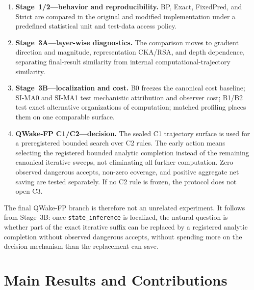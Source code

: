 \begin{enumerate}
  \item \textbf{Stage~1/2---behavior and reproducibility.} BP, Exact, FixedPred, and Strict are compared in the original and modified implementation under a predefined statistical unit and test-data access policy.
  \item \textbf{Stage~3A---layer-wise diagnostics.} The comparison moves to gradient direction and magnitude, representation CKA/RSA, and depth dependence, separating final-result similarity from internal computational-trajectory similarity.
  \item \textbf{Stage~3B---localization and cost.} B0 freezes the canonical cost baseline; SI-MA0 and SI-MA1 test mechanistic attribution and observer cost; B1/B2 test exact alternative organizations of computation; matched profiling places them on one comparable surface.
  \item \textbf{QWake-FP C1/C2---decision.} The sealed C1 trajectory surface is used for a preregistered bounded search over C2 rules. The early action means selecting the registered bounded analytic completion instead of the remaining canonical iterative sweeps, not eliminating all further computation. Zero observed dangerous accepts, non-zero coverage, and positive aggregate net saving are tested separately. If no C2 rule is frozen, the protocol does not open C3.
\end{enumerate}

The final QWake-FP branch is therefore not an unrelated experiment. It follows from
Stage~3B: once \texttt{state\_inference} is localized, the natural question is whether
part of the exact iterative suffix can be replaced by a registered analytic completion
without observed dangerous accepts, without spending more on the decision mechanism
than the replacement can save.

\section{Main Results and Contributions}
\label{sec:intro-contributions-en}

